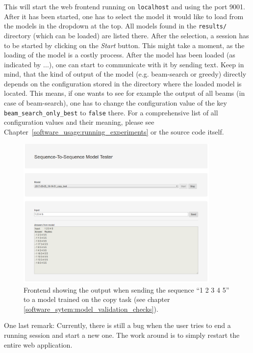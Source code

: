 This will start the web frontend running on \texttt{localhost} and using the port 9001. After it has been started, one has to select the model it would like to load from the models in the dropdown at the top. All models found in the \texttt{results/} directory (which can be loaded) are listed there. After the selection, a session has to be started by clicking on the \emph{Start} button. This might take a moment, as the loading of the model is a costly process. After the model has been loaded (as indicated by ...), one can start to communicate with it by sending text. Keep in mind, that the kind of output of the model (e.g. beam-search or greedy) directly depends on the configuration stored in the directory where the loaded model is located. This means, if one wants to see for example the output of all beams (in case of beam-search), one has to change the configuration value of the key \texttt{beam\_search\_only\_best} to \texttt{false} there. For a comprehensive list of all configuration values and their meaning, please see Chapter~\ref{software_usage:running_experiments} or the source code itself.
\\
\begin{figure}[H]
	\centering
	\includegraphics[width=10cm]{img/web_frontend_inference}
	\caption{Frontend showing the output when sending the sequence ``1 2 3 4 5'' to a model trained on the copy task (see chapter \ref{software_sytem:model_validation_checks}).}
\end{figure}

One last remark: Currently, there is still a bug when the user tries to end a running session and start a new one. The work around is to simply restart the entire web application.
